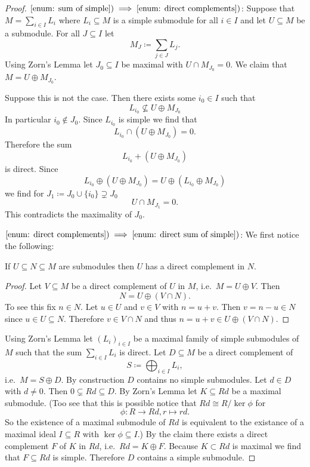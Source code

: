\begin{proof}
 $\ref{enum: sum of simple}) \implies \ref{enum: direct complements})$:
 Suppose that $M = \sum_{i \in I} L_i$ where $L_i \subseteq M$ is a simple submodule for all $i \in I$ and let $U \subseteq M$ be a submodule. For all $J \subseteq I$ let
 \[
  M_J \coloneqq \sum_{j \in J} L_j.
 \]
 Using Zorn’s Lemma let $J_0 \subseteq I$ be maximal with \mbox{$U \cap M_{J_0} = 0$}. We claim that $M = U \oplus M_{J_0}$.
 
 Suppose this is not the case. Then there exists some $i_0 \in I$ such that
 \[
  L_{i_0} \nsubseteq U \oplus M_{J_0}
 \]
 In particular $i_0 \notin J_0$. Since $L_{i_0}$ is simple we find that
 \[
  L_{i_0} \cap (U \oplus M_{J_0}) = 0.
 \]
 Therefore the sum
 \[
  L_{i_0} + (U \oplus M_{J_0})
 \]
 is direct. Since
 \[
  L_{i_0} \oplus (U \oplus M_{J_0}) = U \oplus (L_{i_0} \oplus M_{J_0})
 \]
 we find for $J_1 \coloneqq J_0 \cup \{i_0\} \supsetneq J_0$
 \[
  U \cap M_{J_1} = 0.
 \]
 This contradicts the maximality of $J_0$.
 
 $\ref{enum: direct complements}) \implies \ref{enum: direct sum of simple})$:
 We first notice the following:
 
 \begin{claim}
  If $U \subseteq N \subseteq M$ are submodules then $U$ has a direct complement in $N$.
 \end{claim}
 \begin{proof}
  Let $V \subseteq M$ be a direct complement of $U$ in $M$, i.e.\ $M = U \oplus V$. Then
  \[
   N = U \oplus (V \cap N).
  \]
  To see this fix $n \in N$. Let $u \in U$ and $v \in V$ with $n = u + v$. Then $v = n - u \in N$ since $u \in U \subseteq N$. Therefore $v \in V \cap N$ and thus $n = u + v \in U \oplus (V \cap N)$.
 \end{proof}
 
 Using Zorn’s Lemma let $(L_i)_{i \in I}$ be a maximal family of simple submodules of $M$ such that the sum $\sum_{i \in I} L_i$ is direct. Let $D \subseteq M$ be a direct complement of
 \[
  S \coloneqq \bigoplus_{i \in I} L_i,
 \]
 i.e.\ $M = S \oplus D$. By construction $D$ contains no simple submodules. Let $d \in D$ with $d \neq 0$. Then $0 \subsetneq Rd \subseteq D$. By Zorn’s Lemma let $K \subseteq Rd$ be a maximal submodule. (Too see that this is possible notice that $Rd \cong R/\ker \phi$ for
 \[
  \phi \colon R \to Rd, r \mapsto rd.
 \]
 So the existence of a maximal submodule of $Rd$ is equivalent to the existance of a maximal ideal $I \subseteq R$ with $\ker \phi \subseteq I$.) By the claim there exists a direct complement $F$ of $K$ in $Rd$, i.e.\ $Rd = K \oplus F$. Because $K \subset Rd$ is maximal we find that $F \subseteq Rd$ is simple. Therefore $D$ contains a simple submodule.
\end{proof}


